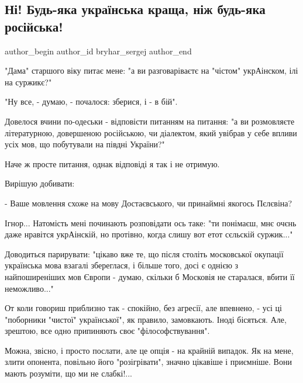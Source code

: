  
 
 
 
 
 
\subsection{Ні! Будь-яка українська краща, ніж будь-яка російська!}
\label{sec:08_09_2021.fb.bryhar_sergej.1.mova_jazyk_surzhik}
 
\ifcmt
 author_begin
   author_id bryhar_sergej
 author_end
\fi

"Дама" старшого віку питає мене: "а ви разговаріваєтє на "чістом" укрАінском,
ілі на суржикє?"

"Ну все, - думаю, - почалося: зберися, і - в бій".

Довелося вчини по-одеськи - відповісти питанням на питання: "а ви розмовляєте
літературною, довершеною російською, чи діалектом, який увібрав у себе впливи
усіх мов, що побутували на півдні України?"

Наче ж просте питання, однак відповіді я так і не отримую.

Вирішую добивати:

- Ваше мовлення схоже на мову Достаєвського, чи принаймні якогось Пєлєвіна?

Ігнор... Натомість мені починають розповідати ось таке: "ти понімаєш, мнє очєнь
даже нравітся укрАінскій, но протівно, когда слишу вот етот сєльскій суржик..."

Доводиться парирувати: "цікаво вже те, що після століть московської окупації
українська мова взагалі збереглася, і більше того, досі є однією з
найпоширеніших мов Європи - думаю, скільки б Московія не старалася, вбити її
неможливо..."

От коли говориш приблизно так - спокійно, без агресії, але впевнено, - усі ці
"поборники "чистої" української", як правило, замовкають. Іноді бісяться. Але,
зрештою, все одно припиняють своє "філософствування".

Можна, звісно, і просто послати, але це опція - на крайній випадок. Як на мене,
злити опонента, повільно його "розігрівати", значно цікавіше і приємніше. Вони
мають розуміти, що ми не слабкі!...

